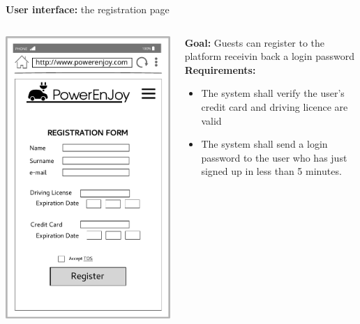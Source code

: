 \documentclass{beamer}
\begin{document}
	\begin{frame}{\textbf{User interface:} the registration page}
	\begin{columns}
			\begin{column}{0.4\textwidth}
				\includegraphics[width=0.9\columnwidth]{figures/sign_up.pdf}
			\end{column}
			\begin{column}{0.5\textwidth}
				\textbf{Goal:} Guests can register to the platform receivin back a login password\\
				\textbf{Requirements:}
				\begin{itemize}
					\item The system shall verify the user's credit card and driving licence are valid
					\item The system shall send a login password to the user who has just signed up in less than 5 minutes. 
				\end{itemize} 
			\end{column}
		\end{columns}
	\end{frame}	
\end{document}
